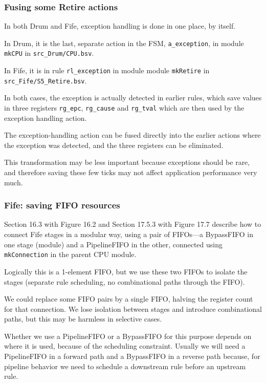 \begin{frame}[fragile]
\frametitle{Fusing some Retire actions}

\footnotesize

In both Drum and Fife, exception handling is done in one place, by
itself.

\vx

In Drum, it is the last, separate action in the FSM,
\verb|a_exception|, in module \verb|mkCPU| in \verb|src_Drum/CPU.bsv|.

\vx

In Fife, it is in rule \verb|rl_exception| in module module
\verb|mkRetire| in \verb|src_Fife/S5_Retire.bsv|.

\PAUSE{\vxxxx}

In both cases, the exception is actually detected in earlier rules,
which save values in three registers \verb|rg_epc|, \verb|rg_cause|
and \verb|rg_tval| which are then used by the exception handling
action.

\vx

The exception-handling action can be fused directly into the earlier
actions where the exception was detected, and the three registers can
be eliminated.

\PAUSE{\vxxxx}

{\scriptsize This transformation may be less important because
exceptions should be rare, and therefore saving these few ticks may
not affect application performance very much.}

\end{frame}


\begin{frame}[fragile]
\frametitle{Fife: saving FIFO resources}

\footnotesize

Section 16.3 with Figure 16.2 and Section 17.5.3 with Figure 17.7
describe how to connect Fife stages in a modular way, using a pair of
FIFOs---a BypassFIFO in one stage (module) and a PipelineFIFO in the
other, connected using \verb|mkConnection| in the parent CPU module.

\vx

Logically this is a 1-element FIFO, but we use these two FIFOs to
isolate the stages (separate rule scheduling, no combinational paths
through the FIFO).

\PAUSE{\vxx}

We could replace some FIFO pairs by a single FIFO, halving the
register count for that connection.  We lose isolation between stages
and introduce combinational paths, but this may be harmless in
selective cases.

\PAUSE{\vxxxx}

Whether we use a PipelineFIFO or a BypassFIFO for this purpose depends
on where it is used, because of the scheduling constraint.  Usually we
will need a PipelineFIFO in a forward path and a BypassFIFO in a
reverse path because, for pipeline behavior we need to schedule a
downstream rule before an upstream rule.

\end{frame}

